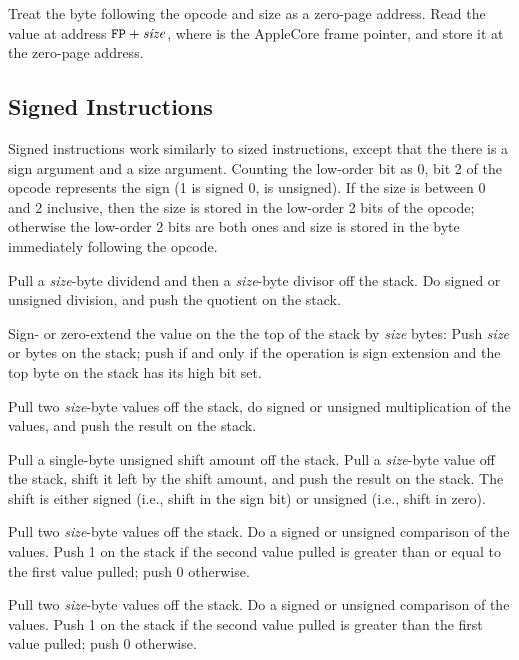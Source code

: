 \documentclass[10pt]{article}
\begin{document}
Treat the byte following the opcode and size as a zero-page
address.  Read the value at address $\texttt{FP}+\mbox{\textit{size}}$, 
where  is the AppleCore frame pointer, and store
it at the zero-page address.

\subsection{Signed Instructions}

Signed instructions work similarly to sized instructions, except that
the there is a sign argument and a size argument.  Counting the
low-order bit as 0, bit 2 of the opcode represents the sign (1 is
signed 0, is unsigned).  If the size is between 0 and 2 inclusive,
then the size is stored in the low-order 2 bits of the opcode;
otherwise the low-order 2 bits are both ones and size is stored in the
byte immediately following the opcode.

 Pull a \emph{size}-byte
dividend and then a \emph{size}-byte divisor off the stack.  Do signed
or unsigned division, and push the quotient on the stack.

 Sign- or zero-extend the
value on the the top of the stack by \emph{size} bytes: Push
\emph{size}  or  bytes on the stack; push
 if and only if the operation is sign extension and the top
byte on the stack has its high bit set.

 Pull two \emph{size}-byte
values off the stack, do signed or unsigned multiplication of the
values, and push the result on the stack.

 Pull a single-byte
unsigned shift amount off the stack.  Pull a \emph{size}-byte value
off the stack, shift it left by the shift amount, and push the result
on the stack.  The shift is either signed (i.e., shift in the sign
bit) or unsigned (i.e., shift in zero).

 Pull two
\emph{size}-byte values off the stack. Do a signed or unsigned
comparison of the values.  Push 1 on the stack if the second value
pulled is greater than or equal to the first value pulled; push 0
otherwise.

 Pull two
\emph{size}-byte values off the stack. Do a signed or unsigned
comparison of the values.  Push 1 on the stack if the second value
pulled is greater than the first value pulled; push 0 otherwise.
\end{document}
